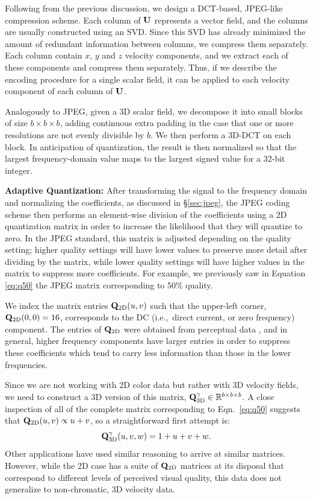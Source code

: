 Following from the previous discussion, we design a DCT-based, JPEG-like compression scheme. Each column of $\mathbf{U}$ represents a vector field, and the columns are usually constructed using an SVD. Since this SVD has already minimized the amount of redundant information between columns, we compress them separately. Each column contain $x$, $y$ and $z$ velocity components, and we extract each of these components and compress them separately. Thus, if we describe the encoding procedure for a single scalar field, it can be applied to each velocity component of each column of $\mathbf{U}$.

Analogously to JPEG, given a 3D scalar field, we decompose it into small blocks of size $b \times b \times b$, adding continuous extra padding in the case that one or more resolutions are not evenly divisible by $b$. We then perform a 3D-DCT on each block. In anticipation of quantization, the result is then normalized so that the largest frequency-domain value maps to the largest signed value for a 32-bit integer.

\noindent \textbf{Adaptive Quantization:} After transforming the signal to the frequency domain and normalizing the coefficients, as discussed in \S\ref{sec:jpeg}, the JPEG coding scheme then performs an element-wise division of the coefficients using a 2D quantization matrix in order to increase the likelihood that they will quantize to zero. In the JPEG standard, this matrix is adjusted depending on the quality setting; higher quality settings will have lower values to preserve more detail after dividing by the matrix, while lower quality settings will have higher values in the matrix to suppress more coefficients. For example, we previously saw in Equation \ref{eq:q50} the JPEG matrix corresponding to 50\% quality.

We index the matrix entries $\mathbf{Q}_{\textrm{2D}}(u,v)$ such that the upper-left corner, $\mathbf{Q}_{\textrm{2D}}(0,0) = 16$, corresponds to the DC (i.e.,~direct current, or zero frequency) component.  The entries of $\mathbf{Q}_{\textrm{2D}}$ were obtained from perceptual data \cite{Sayood:2012:JPEG}, and in general, higher frequency components have larger entries in order to suppress these coefficients which tend to carry less information than those in the lower frequencies.

Since we are not working with 2D color data but rather with 3D velocity fields, we need to construct a 3D version of this matrix, $\mathbf{Q}^{\gamma}_{\textrm{3D}} \in \mathbb{R}^{b \times b \times b}$. A close inspection of all of the complete matrix corresponding to Eqn.~\ref{eq:q50} suggests that $\mathbf{Q}_{\textrm{2D}}(u,v) \propto u + v$, so a straightforward first attempt is:
\begin{equation}
\mathbf{Q}^{\gamma}_{\textrm{3D}}(u,v,w) = 1 + u + v + w.
\end{equation}
Other applications \cite{Yeo:1995:VRD} have used similar reasoning to arrive at similar matrices. However, while the 2D case has a suite of $\mathbf{Q}_{\textrm{2D}}$ matrices at its disposal that correspond to different levels of perceived visual quality, this data does not generalize to non-chromatic, 3D velocity data.

